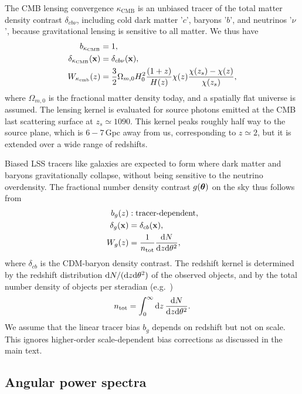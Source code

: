 \documentclass[prd,superscriptaddress,floatfix,notitlepage,nofootinbib,reprint]{revtex4-1} %
\begin{document}
The CMB lensing convergence $\kappa_\mathrm{CMB}$ is an unbiased tracer of the total matter density contrast $\delta_{cb\nu}$, including cold dark matter '$c$', baryons '$b$', and neutrinos '$\nu$', because gravitational lensing is sensitive to all matter. 
We thus have
\begin{align}
  \label{eq:1}
  b_{\kappa_\mathrm{CMB}}&=1,\nonumber\\
\delta_{\kappa_\mathrm{CMB}}({\mathbf{x}}) &= \delta_{cb\nu}({\mathbf{x}}),\nonumber\\
  W_{\kappa_\mathrm{cmb}}(z) &= \frac{3}{2}\Omega_{m,0}H_0^2 \frac{(1+z)}{H(z)}\chi(z)\frac{\chi(z_s)-\chi(z)}{\chi(z_s)},
\end{align}
where $\Omega_{m,0}$ is the fractional matter density today, and a spatially flat universe is assumed.
The lensing kernel is evaluated for source photons emitted at the CMB last scattering surface at $z_s\simeq 1090$.
This kernel peaks roughly half way to the source plane, which is $6\!-\!7\,$Gpc away from us, corresponding to $z\simeq 2$, but it is extended over a wide range of redshifts. 


Biased LSS tracers like galaxies are expected to form where dark matter and baryons gravitationally collapse, without being sensitive to the neutrino overdensity.  
The fractional number density contrast $g(\boldsymbol\theta)$ on the sky thus follows from
\begin{align}
  \label{eq:16}
  b_g(z)&: \text{tracer-dependent},\nonumber\\
  \delta_g({\mathbf{x}}) &= \delta_{cb}({\mathbf{x}}),\nonumber\\
  W_g(z) & = \frac{1}{n_\mathrm{tot}} \frac{\mathrm{d} N}{\mathrm{d} z\mathrm{d}\theta^2},
\end{align}
where $\delta_{cb}$ is the CDM-baryon density contrast.
The redshift kernel is determined by the redshift distribution $\mathrm{d} N/(\mathrm{d} z\mathrm{d}\theta^2)$ of the observed objects, and by the total number density of objects per steradian (e.g.~\cite{FontRibera1308})
\begin{align}
  \label{eq:11}
n_\mathrm{tot} = \int_0^\infty\mathrm{d} z\,\frac{\mathrm{d} N}{\mathrm{d} z\mathrm{d}\theta^2}.
\end{align}
We assume that the linear tracer bias $b_g$ depends on redshift but not on scale.
This ignores higher-order scale-dependent bias corrections as discussed in the main text.


\subsection{Angular power spectra}
\end{document}
